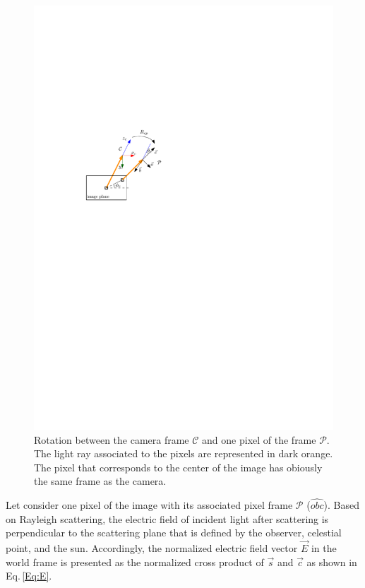 \begin{figure}
  \centering
  \includegraphics[scale=0.8]{./content/intro/figures/pixelframe.pdf}
  \caption{Rotation between the camera frame $\mathcal{C}$ and one pixel of the frame $\mathcal{P}$. The light ray associated to the pixels are represented in dark orange. The pixel that corresponds to the center of the image has obiously the same frame as the camera.}
    \label{fig:pixelframe}
\end{figure}

Let consider one pixel of the image with its associated pixel frame $\mathcal{P}$ ($\widehat{obc}$).
Based on Rayleigh scattering, the electric field of incident light after
scattering is perpendicular to the scattering plane that is defined by the
observer, celestial point, and the sun.
Accordingly, the normalized electric field vector $\vec{E}$ in the world frame
is presented as the normalized cross product of $\vec{s}$ and
$\vec{c}$ as shown in Eq.\,\eqref{Eq:E}.

